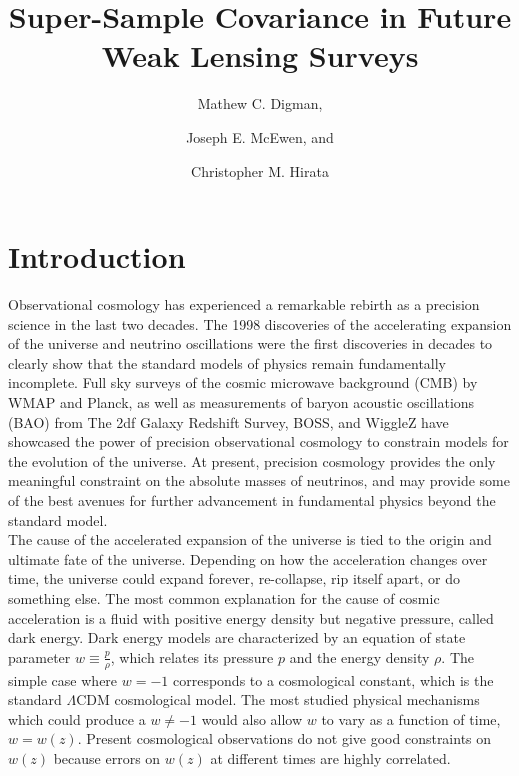 \documentclass[a4paper,11pt]{article}
\title{\boldmath Super-Sample Covariance in Future Weak Lensing Surveys}
\author{Mathew C. Digman,}
\author{Joseph E. McEwen, and}
\author{Christopher M. Hirata}
\affiliation{Center for Cosmology and AstroParticle Physics, Department of Physics, The Ohio State University, 191 W Woodruff Ave, Columbus OH 43210, USA}
\begin{document}
\maketitle
\flushbottom

\section{Introduction}
\label{sec:intro} 
Observational cosmology has experienced a remarkable rebirth as a precision science in the last two decades. The 1998 discoveries of the accelerating expansion of the universe\cite{Perlmutter:1998np}\cite{Riess:1998cb} and neutrino oscillations\cite{Fukuda:1998mi} were the first discoveries in decades to clearly show that the standard models of physics remain fundamentally incomplete. Full sky surveys of the cosmic microwave background (CMB) by WMAP\cite{wmap1year}\cite{wmap9year} and Planck\cite{planck2015params}, as well as measurements of baryon acoustic oscillations (BAO) from The 2df Galaxy Redshift Survey\cite{2df2005}, BOSS\cite{boss2013}, and WiggleZ\cite{wigglez2012} have showcased the power of precision observational cosmology to constrain models for the evolution of the universe. At present, precision cosmology provides the only meaningful constraint on the absolute masses of neutrinos\cite{neutrinomasscosmology}, and may provide some of the best avenues for further advancement in fundamental physics beyond the standard model. 
\\
The cause of the accelerated expansion of the universe is tied to the origin and ultimate fate of the universe. Depending on how the acceleration changes over time, the universe could expand forever, re-collapse, rip itself apart, or do something else\cite{bigripcaldwell}\cite{fate_universe}. The most common explanation for the cause of cosmic acceleration is a fluid with positive energy density but negative pressure, called dark energy.  Dark energy models are characterized by an equation of state parameter $w\equiv \frac{p}{\rho}$, which relates its pressure $p$ and the energy density $\rho$\cite{constraining_de}. The simple case where $w=-1$ corresponds to a cosmological constant, which is the standard $\Lambda$CDM cosmological model. The most studied physical mechanisms which could produce a $w\neq-1$ would also allow $w$ to vary as a function of time, $w=w(z)$\cite{quintessence_caldwell}. Present cosmological observations do not give good constraints on $w(z)$ because errors on $w(z)$ at different times are highly correlated\cite{weinberg_probes}\cite{eos_pitfalls}. 
\end{document}
